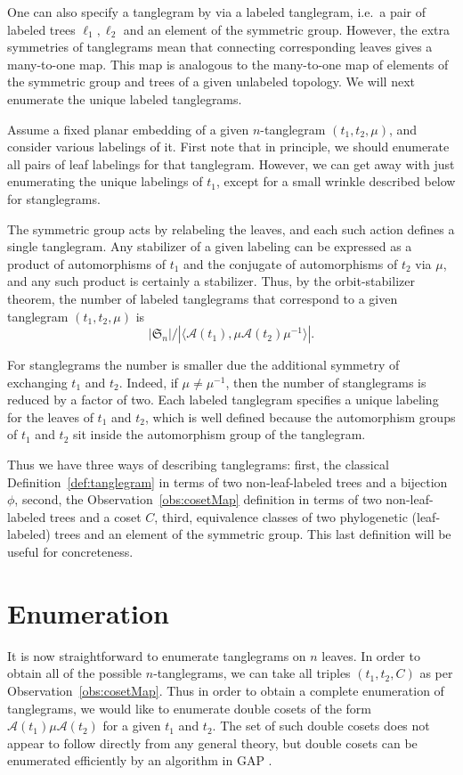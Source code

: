 \documentclass{amsart}
\newcommand{\fS}{\mathfrak S}
\newcommand{\aut}{\mathcal A}
\newcommand{\pairing}{\mu}
\begin{document}
One can also specify a tanglegram by via a labeled tanglegram, i.e.\ a pair of labeled trees $\ell_1, \ell_2$ and an element of the symmetric group.
However, the extra symmetries of tanglegrams mean that connecting corresponding leaves gives a many-to-one map.
This map is analogous to the many-to-one map of elements of the symmetric group and trees of a given unlabeled topology.
We will next enumerate the unique labeled tanglegrams.

Assume a fixed planar embedding of a given $n$-tanglegram $(t_1, t_2, \pairing)$, and consider various labelings of it.
First note that in principle, we should enumerate all pairs of leaf labelings for that tanglegram.
However, we can get away with just enumerating the unique labelings of $t_1$, except for a small wrinkle described below for stanglegrams.

The symmetric group acts by relabeling the leaves, and each such action defines a single tanglegram.
Any stabilizer of a given labeling can be expressed as a product of automorphisms of $t_1$ and the conjugate of automorphisms of $t_2$ via $\pairing$, and any such product is certainly a stabilizer.
Thus, by the orbit-stabilizer theorem, the number of labeled tanglegrams that correspond to a given tanglegram $(t_1, t_2, \pairing)$ is
\[
|\fS_n| / |\langle \aut(t_1), \pairing \aut(t_2) \pairing^{-1} \rangle|.
\]

For stanglegrams the number is smaller due the additional symmetry of exchanging $t_1$ and $t_2$.
Indeed, if $\pairing \neq \pairing^{-1}$, then the number of stanglegrams is reduced by a factor of two.
Each labeled tanglegram specifies a unique labeling for the leaves of $t_1$ and $t_2$, which is well defined because the automorphism groups of $t_1$ and $t_2$ sit inside the automorphism group of the tanglegram.

Thus we have three ways of describing tanglegrams:
first, the classical Definition~\ref{def:tanglegram} in terms of two non-leaf-labeled trees and a bijection $\phi$,
second, the Observation~\ref{obs:cosetMap} definition in terms of two non-leaf-labeled trees and a coset $C$,
third, equivalence classes of two phylogenetic (leaf-labeled) trees and an element of the symmetric group.
This last definition will be useful for concreteness.


\section{Enumeration}
It is now straightforward to enumerate tanglegrams on $n$ leaves.
In order to obtain all of the possible $n$-tanglegrams, we can take all triples $(t_1, t_2, C)$ as per Observation~\ref{obs:cosetMap}.
Thus in order to obtain a complete enumeration of tanglegrams, we would like to enumerate double cosets of the form $\aut(t_1) \pairing \aut(t_2)$ for a given $t_1$ and $t_2$.
The set of such double cosets does not appear to follow directly from any general theory, but double cosets can be enumerated efficiently by an algorithm in GAP \cite{GAP4}.
\end{document}
